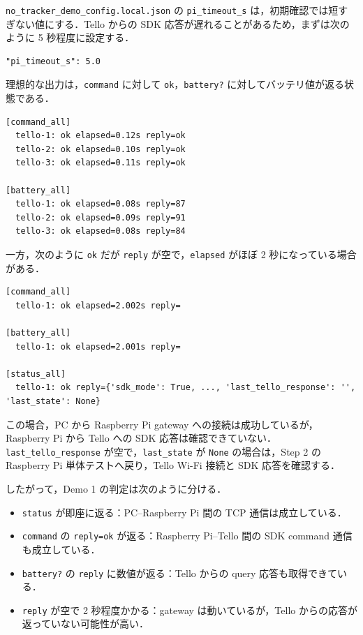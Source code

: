 \texttt{no\_tracker\_demo\_config.local.json} の \texttt{pi\_timeout\_s} は，初期確認では短すぎない値にする．Tello からの SDK 応答が遅れることがあるため，まずは次のように 5 秒程度に設定する．

\begin{lstlisting}
"pi_timeout_s": 5.0
\end{lstlisting}

理想的な出力は，\texttt{command} に対して \texttt{ok}，\texttt{battery?} に対してバッテリ値が返る状態である．

\begin{lstlisting}
[command_all]
  tello-1: ok elapsed=0.12s reply=ok
  tello-2: ok elapsed=0.10s reply=ok
  tello-3: ok elapsed=0.11s reply=ok

[battery_all]
  tello-1: ok elapsed=0.08s reply=87
  tello-2: ok elapsed=0.09s reply=91
  tello-3: ok elapsed=0.08s reply=84
\end{lstlisting}

一方，次のように \texttt{ok} だが \texttt{reply} が空で，\texttt{elapsed} がほぼ 2 秒になっている場合がある．

\begin{lstlisting}
[command_all]
  tello-1: ok elapsed=2.002s reply=

[battery_all]
  tello-1: ok elapsed=2.001s reply=

[status_all]
  tello-1: ok reply={'sdk_mode': True, ..., 'last_tello_response': '', 'last_state': None}
\end{lstlisting}

この場合，PC から Raspberry Pi gateway への接続は成功しているが，Raspberry Pi から Tello への SDK 応答は確認できていない．\texttt{last\_tello\_response} が空で，\texttt{last\_state} が \texttt{None} の場合は，Step 2 の Raspberry Pi 単体テストへ戻り，Tello Wi-Fi 接続と SDK 応答を確認する．

したがって，Demo 1 の判定は次のように分ける．

\begin{itemize}
  \item \texttt{status} が即座に返る：PC--Raspberry Pi 間の TCP 通信は成立している．
  \item \texttt{command} の \texttt{reply=ok} が返る：Raspberry Pi--Tello 間の SDK command 通信も成立している．
  \item \texttt{battery?} の \texttt{reply} に数値が返る：Tello からの query 応答も取得できている．
  \item \texttt{reply} が空で 2 秒程度かかる：gateway は動いているが，Tello からの応答が返っていない可能性が高い．
\end{itemize}

